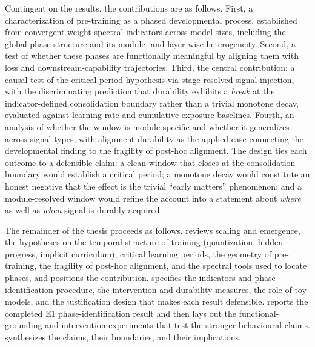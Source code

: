 Contingent on the results, the contributions are as follows. First, a characterization of
pre-training as a phased developmental process, established from convergent weight-spectral
indicators across model sizes, including the global phase structure and its module- and
layer-wise heterogeneity. Second, a test of whether these phases are functionally meaningful by
aligning them with loss and downstream-capability trajectories. Third, the central
contribution: a causal test of the critical-period hypothesis via stage-resolved signal
injection, with the discriminating prediction that durability exhibits a \emph{break} at the
indicator-defined consolidation boundary rather than a trivial monotone decay, evaluated against
learning-rate and cumulative-exposure baselines. Fourth, an analysis of whether the window is
module-specific and whether it generalizes across signal types, with alignment durability as the
applied case connecting the developmental finding to the fragility of post-hoc alignment. The
design ties each outcome to a defensible claim: a clean window that closes at the consolidation
boundary would establish a critical period; a monotone decay would constitute an honest negative
that the effect is the trivial ``early matters'' phenomenon; and a module-resolved window would
refine the account into a statement about \emph{where} as well as \emph{when} signal is durably
acquired.

The remainder of the thesis proceeds as follows.  reviews scaling and
emergence, the hypotheses on the temporal structure of training (quantization, hidden progress,
implicit curriculum), critical learning periods, the geometry of pre-training, the fragility of
post-hoc alignment, and the spectral tools used to locate phases, and positions the contribution.
 specifies the indicators and phase-identification procedure, the
intervention and durability measures, the role of toy models, and the justification design that
makes each result defensible.  reports the completed E1 phase-identification
result and then lays out the functional-grounding and intervention experiments that test the
stronger behavioural claims.  synthesizes the claims, their boundaries, and
their implications.
